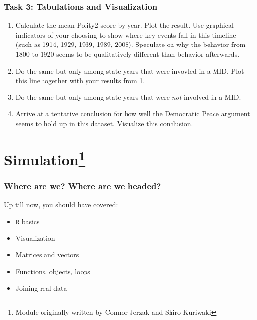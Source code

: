 \documentclass[]{book}
\providecommand{\tightlist}{%
  \setlength{\itemsep}{0pt}\setlength{\parskip}{0pt}}
\let\rmarkdownfootnote\footnote%
\def\footnote{\protect\rmarkdownfootnote}
\theoremstyle{definition}
\theoremstyle{definition}
\theoremstyle{definition}
\theoremstyle{remark}
\begin{document}
\subsection*{Task 3: Tabulations and
Visualization}\label{task-3-tabulations-and-visualization}

\begin{enumerate}
\def\labelenumi{\arabic{enumi}.}
\tightlist
\item
  Calculate the mean Polity2 score by year. Plot the result. Use
  graphical indicators of your choosing to show where key events fall in
  this timeline (such as 1914, 1929, 1939, 1989, 2008). Speculate on why
  the behavior from 1800 to 1920 seems to be qualitatively different
  than behavior afterwards.
\item
  Do the same but only among state-years that were invovled in a MID.
  Plot this line together with your results from 1.
\item
  Do the same but only among state years that were \emph{not} involved
  in a MID.
\item
  Arrive at a tentative conclusion for how well the Democratic Peace
  argument seems to hold up in this dataset. Visualize this conclusion.
\end{enumerate}

\chapter[Simulation]{\texorpdfstring{Simulation\footnote{Module
  originally written by Connor Jerzak and Shiro Kuriwaki}}{Simulation}}\label{simulation}

\subsection*{Where are we? Where are we
headed?}\label{where-are-we-where-are-we-headed-5}

Up till now, you should have covered:

\begin{itemize}
\tightlist
\item
  \texttt{R} basics
\item
  Visualization
\item
  Matrices and vectors
\item
  Functions, objects, loops
\item
  Joining real data
\end{itemize}
\end{document}
